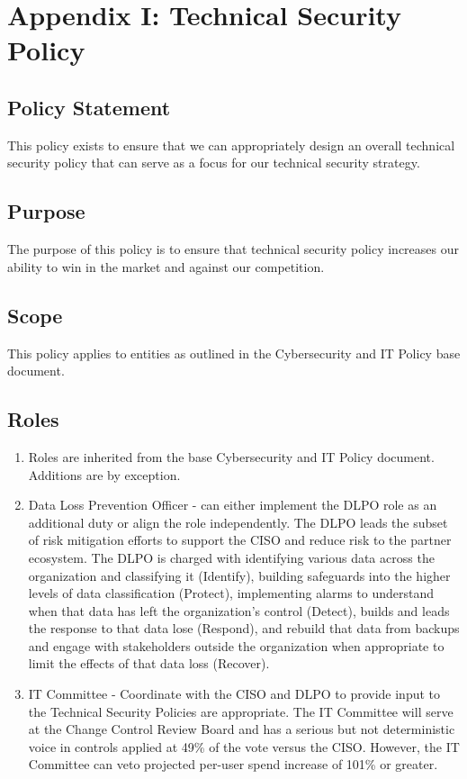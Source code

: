 \documentclass[../main.tex]{subfiles}
\begin{document}
\section{Appendix I: Technical Security Policy}
\subsection{Policy Statement}
This policy exists to ensure that we can appropriately design an overall technical security policy that can serve as a focus for our technical security strategy.
\subsection{Purpose}
The purpose of this policy is to ensure that technical security policy increases our ability to win in the market and against our competition.
\subsection{Scope}
This policy applies to entities as outlined in the Cybersecurity and IT Policy base document.
\subsection{Roles}
\begin{enumerate}
    \item Roles are inherited from the base Cybersecurity and IT Policy document. Additions are by exception.
    \item Data Loss Prevention Officer - \CompanyName{} can either implement the DLPO role as an additional duty or align the role independently.
    The DLPO leads the subset of risk mitigation efforts to support the CISO and reduce risk to the partner ecosystem. The DLPO is charged with
    identifying various data across the organization and classifying it (Identify), building safeguards into the higher levels of data classification (Protect),
    implementing alarms to understand when that data has left the organization's control (Detect), builds and leads the response to that data lose (Respond),
    and rebuild that data from backups and engage with stakeholders outside the organization when appropriate to limit the effects of that data loss (Recover).
    \item IT Committee - Coordinate with the CISO and DLPO to provide input to the Technical Security Policies are appropriate. The IT Committee will serve at the
    Change Control Review Board and has a serious but not deterministic voice in controls applied at 49\% of the vote versus the CISO. However, the IT Committee can veto
    projected per-user spend increase of 101\% or greater.
\end{enumerate}
\end{document}
